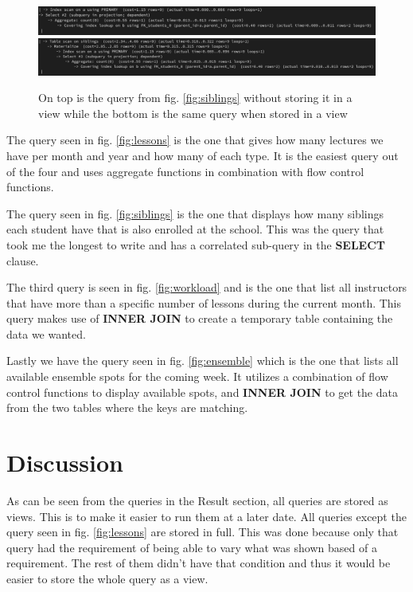 \documentclass[a4paper]{scrreprt}
\begin{document}
\begin{figure}[h]
    \begin{center}
        \includegraphics[width=\textwidth]{../img/explain_no_view_siblings.png} \\
        \includegraphics[width=\textwidth]{../img/explain_sibling.png}
        \caption{On top is the query from fig. \ref{fig:siblings} without storing it in a view while the bottom is the same query when stored in a view}
        \label{fig:explainSiblings}
    \end{center}
\end{figure}

The query seen in fig. \ref{fig:lessons} is the one that gives how many lectures we have per month and year and how many of each type. It is the easiest query out of 
the four and uses aggregate functions in combination with flow control functions.

The query seen in fig. \ref{fig:siblings} is the one that displays how many siblings each student have that is also enrolled at the school. This was the query that took
me the longest to write and has a correlated sub-query in the \textbf{SELECT} clause.

The third query is seen in fig. \ref{fig:workload} and is the one that list all instructors that have more than a specific number of lessons during the current month.
This query makes use of \textbf{INNER JOIN} to create a temporary table containing the data we wanted. 

Lastly we have the query seen in fig. \ref{fig:ensemble} which is the one that lists all available ensemble spots for the coming week. It utilizes a combination of flow
control functions to display available spots, and \textbf{INNER JOIN} to get the data from the two tables where the keys are matching.




\chapter{Discussion}
As can be seen from the queries in the Result section, all queries are stored as views. This is to make it easier to run them at a later date. All queries except the 
query seen in fig. \ref{fig:lessons} are stored in full. This was done because only that query had the requirement of being able to vary what was shown based of a 
requirement. The rest of them didn't have that condition and thus it would be easier to store the whole query as a view. 
\end{document}
